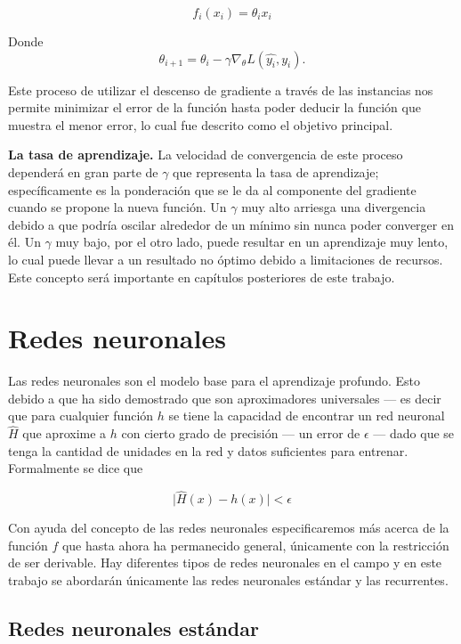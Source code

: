 \[ f_i(x_i) = \theta_i x_i \]

Donde
\begin{equation}
\label{eq:sgdupdate}
\theta_{i + 1} = \theta_{i} - \gamma \nabla_{\theta} L(\hat{y_i}, y_i).
\end{equation}

Este proceso de utilizar el descenso de gradiente a través de las instancias nos permite  minimizar el error de la función hasta poder deducir la función que muestra el menor error, lo cual fue descrito como el objetivo principal.

\textbf{La tasa de aprendizaje.} La velocidad de convergencia de este proceso dependerá en gran parte de $\gamma$ que representa la tasa de aprendizaje; específicamente es la ponderación que se le da al componente del gradiente cuando se propone la nueva función. Un $\gamma$ muy alto arriesga una divergencia debido a que podría oscilar alrededor de un mínimo sin nunca poder converger en él. Un $\gamma$ muy bajo, por el otro lado, puede resultar en un aprendizaje muy lento, lo cual puede llevar a un resultado no óptimo debido a limitaciones de recursos. Este concepto será importante en capítulos posteriores de este trabajo.

\section{Redes neuronales}

Las redes neuronales son el modelo base para el aprendizaje profundo. Esto debido a que ha sido demostrado que son aproximadores universales \parencite{hornik1989universal} --- es decir que para cualquier función $h$ se tiene la capacidad de encontrar un red neuronal $\hat{H}$ que aproxime a $h$ con cierto grado de precisión --- un error de $\epsilon$ --- dado que se tenga la cantidad de unidades en la red y datos suficientes para entrenar. Formalmente se dice que

\begin{equation}
\label{eq:universaltheorem}
\vert \hat{H}(x) - h(x) \vert < \epsilon
\end{equation}

Con ayuda del concepto de las redes neuronales especificaremos más acerca de la función $f$ que hasta ahora ha permanecido general, únicamente con la restricción de ser derivable. Hay diferentes tipos de redes neuronales en el campo y en este trabajo se abordarán únicamente las redes neuronales estándar y las recurrentes.

\subsection{Redes neuronales estándar}

